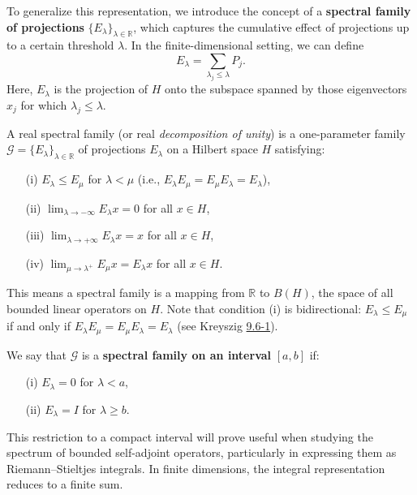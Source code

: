 To generalize this representation, we introduce the concept of a \textbf{spectral family of projections} \( \{E_\lambda\}_{\lambda \in \mathbb{R}} \), which captures the cumulative effect of projections up to a certain threshold \( \lambda \). In the finite-dimensional setting, we can define
\[
    E_\lambda = \sum_{\lambda_j \leq \lambda} P_j. \tag{5}
\]
Here, \( E_\lambda \) is the projection of \( H \) onto the subspace spanned by those eigenvectors \( x_j \) for which \( \lambda_j \leq \lambda \).

\begin{definition}\label{9.7-1}
A real spectral family (or real \textit{decomposition of unity}) is a one-parameter family \( \mathcal{G} = \{E_\lambda\}_{\lambda \in \mathbb{R}} \) of projections \( E_\lambda \) on a Hilbert space \( H \) satisfying:
\begin{enumerate}
    \item[(i)] \( E_\lambda \leq E_\mu \) for \( \lambda < \mu \) (i.e., \( E_\lambda E_\mu = E_\mu E_\lambda = E_\lambda \)),
    \item[(ii)] \( \lim_{\lambda \to -\infty} E_\lambda x = 0 \) for all \( x \in H \),
    \item[(iii)] \( \lim_{\lambda \to +\infty} E_\lambda x = x \) for all \( x \in H \),
    \item[(iv)] \( \lim_{\mu \to \lambda^+} E_\mu x = E_\lambda x \) for all \( x \in H \).
\end{enumerate}
\end{definition}

This means a spectral family is a mapping from \( \mathbb{R} \) to \( B(H) \), the space of all bounded linear operators on \( H \). Note that condition (i) is bidirectional: \( E_\lambda \leq E_\mu \) if and only if \( E_\lambda E_\mu = E_\mu E_\lambda = E_\lambda \) (see Kreyszig {\hyperref[9.6-1]{9.6-1}}).

We say that \( \mathcal{G} \) is a \textbf{spectral family on an interval} \( [a,b] \) if:
\begin{enumerate}
    \item[(i)] \( E_\lambda = 0 \) for \( \lambda < a \),
    \item[(ii)] \( E_\lambda = I \) for \( \lambda \geq b \).
\end{enumerate}

This restriction to a compact interval will prove useful when studying the spectrum of bounded self-adjoint operators, particularly in expressing them as Riemann–Stieltjes integrals. In finite dimensions, the integral representation reduces to a finite sum.

